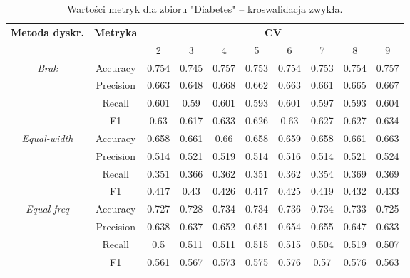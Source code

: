  \begin{table}[H]
    \center
    \caption{Wartości metryk dla zbioru "Diabetes" -- kroswalidacja zwykła.}
    \begin{tabular}{|c|c|c|c|c|c|c|c|c|c|}
        \hline
        \multirow{2}{*}{\textbf{Metoda dyskr.}} & \multirow{2}{*}{\textbf{Metryka}} & \multicolumn{8}{|c|}{\textbf{CV}} \\ \cline{3-10}
                                                &  & 2 & 3 & 4 & 5 & 6 & 7 & 8 & 9 \\ \hline
            \multirow{4}{*}{\textit{Brak}}  & Accuracy & 0.754 & 0.745 & 0.757 & 0.753 & 0.754 & 0.753 & 0.754 & 0.757 \\ \cline{2-10}
                                             & Precision & 0.663 & 0.648 & 0.668 & 0.662 & 0.663 & 0.661 & 0.665 & 0.667 \\ \cline{2-10}
                                             & Recall & 0.601 & 0.59 & 0.601 & 0.593 & 0.601 & 0.597 & 0.593 & 0.604 \\ \cline{2-10}
                                             & F1 & 0.63 & 0.617 & 0.633 & 0.626 & 0.63 & 0.627 & 0.627 & 0.634 \\ \hline  \hline


                                            \multirow{4}{*}{\textit{Equal-width}}  & Accuracy & 0.658 & 0.661 & 0.66 & 0.658 & 0.659 & 0.658 & 0.661 & 0.663 \\ \cline{2-10}
                                             & Precision & 0.514 & 0.521 & 0.519 & 0.514 & 0.516 & 0.514 & 0.521 & 0.524 \\ \cline{2-10}
                                             & Recall & 0.351 & 0.366 & 0.362 & 0.351 & 0.362 & 0.354 & 0.369 & 0.369 \\ \cline{2-10}
                                             & F1 & 0.417 & 0.43 & 0.426 & 0.417 & 0.425 & 0.419 & 0.432 & 0.433 \\ \hline  \hline


                                            \multirow{4}{*}{\textit{Equal-freq}}  & Accuracy & 0.727 & 0.728 & 0.734 & 0.734 & 0.736 & 0.734 & 0.733 & 0.725 \\ \cline{2-10}
                                             & Precision & 0.638 & 0.637 & 0.652 & 0.651 & 0.654 & 0.655 & 0.647 & 0.633 \\ \cline{2-10}
                                             & Recall & 0.5 & 0.511 & 0.511 & 0.515 & 0.515 & 0.504 & 0.519 & 0.507 \\ \cline{2-10}
                                             & F1 & 0.561 & 0.567 & 0.573 & 0.575 & 0.576 & 0.57 & 0.576 & 0.563 \\ \hline  \hline



\end{tabular}
\end{table}
